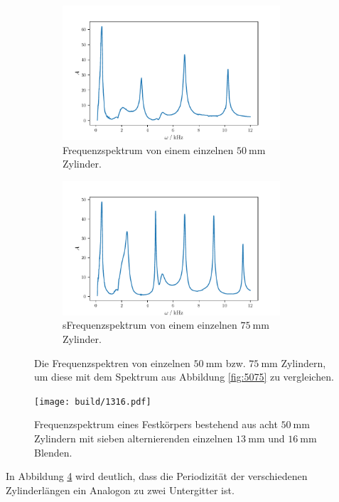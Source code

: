 \begin{figure}
    \begin{subfigure}{0.48\textwidth}%
        \centering%
        \includegraphics[height=5cm]{build/50single.pdf}%
        \caption{Frequenzspektrum von einem einzelnen $\qty{50}{\milli\meter}$ Zylinder.}%
        \label{fig:50sinlge}%
    \end{subfigure}%
    \hfill%
    \begin{subfigure}{0.48\textwidth}%
        \centering%
        \includegraphics[height=5cm]{build/75single.pdf}%
        \caption{sFrequenzspektrum von einem einzelnen $\qty{75}{\milli\meter}$ Zylinder.}%
        \label{fig:75single}%
    \end{subfigure}%
    \caption{Die Frequenzspektren von einzelnen $\qty{50}{\milli\meter}$ bzw. $\qty{75}{\milli\meter}$ Zylindern, um diese mit dem Spektrum
    aus Abbildung \ref{fig:5075} zu vergleichen.}%
    \label{fig:75and50single}
\end{figure}%
\begin{figure}
    \centering
    \texttt{[image: build/1316.pdf]}
    \caption{Frequenzspektrum eines Festkörpers bestehend aus acht $\qty{50}{\milli\meter}$ Zylindern mit sieben alternierenden einzelnen $\qty{13}{\milli\meter}$ und 
    $\qty{16}{\milli\meter}$ Blenden.}
    \label{fig:1316}
\end{figure}
In Abbildung \ref{fig:1316} wird deutlich, dass die Periodizität der verschiedenen Zylinderlängen ein Analogon zu zwei Untergitter ist. 